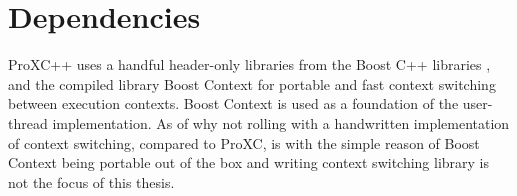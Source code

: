 \section{Dependencies}
\label{sec:dependencies}


ProXC++ uses a handful header\hyp{}only libraries from the Boost C++ libraries \citep{boost2017boost}, and the compiled library Boost Context \citep{kowalke2017boost} for portable and fast context switching between execution contexts. Boost Context is used as a foundation of the user\hyp{}thread implementation. As of why not rolling with a handwritten implementation of context switching, compared to ProXC, is with the simple reason of Boost Context being portable out of the box and writing context switching library is not the focus of this thesis.

